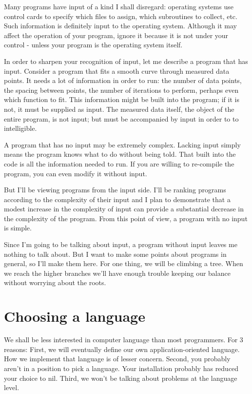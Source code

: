 \documentclass[b5paper, oneside]{book}
\begin{document}
Many programs have input of a kind I shall disregard: operating systems use control cards to specify which files to assign, which subroutines to collect, etc. Such information is definitely input to the operating system. Although it may affect the operation of your program, ignore it because it is not under your control - unless your program is the operating system itself.

In order to sharpen your recognition of input, let me describe a program that has input. Consider a program that fits a smooth curve through measured data points. It needs a lot of information in order to run: the number of data points, the spacing between points, the number of iterations to perform, perhaps even which function to fit. This information might be built into the program; if it is not, it must be supplied as input. The measured data itself, the object of the entire program, is not input; but must be accompanied by input in order to to intelligible.

A program that has no input may be extremely complex. Lacking input simply means the program knows what to do without being told. That built into the code is all the information needed to run. If you are willing to re-compile the program, you can even modify it without input.

But I'll be viewing programs from the input side. I'll be ranking programs according to the complexity of their input and I plan to demonstrate that a modest increase in the complexity of input can provide a substantial decrease in the complexity of the program. From this point of view, a program with no input is simple.

Since I'm going to be talking about input, a program without input leaves me nothing to talk about. But I want to make some points about programs in general, so I'll make them here. For one thing, we will be climbing a tree. When we reach the higher branches we'll have enough trouble keeping our balance without worrying about the roots.

\section{Choosing a language}
We shall be less interested in computer language than most programmers. For 3 reasons: First, we will eventually define our own application-oriented language. How we implement that language is of lesser concern. Second, you probably aren't in a position to pick a language. Your installation probably has reduced your choice to nil. Third, we won't be talking about problems at the language level.
\end{document}
